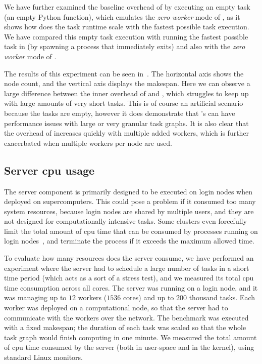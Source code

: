 We have further examined the baseline overhead of \dask{} by executing an empty
task (an empty Python function), which emulates the \emph{zero worker} mode of
\hyperqueue{}, as it shows how does the task runtime scale with the fastest possible task
execution. We have compared this empty task execution with running the fastest possible task in
\hyperqueue{} (by spawning a process that immediately exits) and also with the \emph{zero worker} mode of \hyperqueue{}.

The results of this experiment can be seen in~. The horizontal axis shows
the node count, and the vertical axis displays the makespan. Here we can observe a large difference
between the inner overhead of \hyperqueue{} and \dask{}, which struggles
to keep up with large amounts of very short tasks. This is of course an artificial scenario because
the tasks are empty, however it does demonstrate that \dask{}'s can have
performance issues with large or very granular task graphs. It is also clear that the overhead of
\dask{} increases quickly with multiple added workers, which is further exacerbated
when multiple workers per node are used.


\subsection{Server \gls{cpu} usage}
\label{sec:hq-exp-server-cpu-usage}
The \hyperqueue{} server component is primarily designed to be executed on login nodes
when deployed on supercomputers. This could pose a problem if it consumed too many system
resources, because login nodes are shared by multiple users, and they are not designed for
computationally intensive tasks. Some clusters even forcefully limit the total amount of
\gls{cpu} time that can be consumed by processes running on login
nodes~\cite{leonardo_time_limit}, and terminate the process if it exceeds the maximum allowed time.

To evaluate how many resources does the server consume, we have performed an experiment where the
server had to schedule a large number of tasks in a short time period (which acts as a sort of a
stress test), and we measured its total \gls{cpu} time consumption across all cores.
The server was running on a login node, and it was managing up to $12$ workers
($1536$ cores) and up to $200$ thousand tasks. Each worker was
deployed on a computational node, so that the server had to communicate with the workers over the
network. The benchmark was executed with a fixed makespan; the duration of each task was scaled so
that the whole task graph would finish computing in one minute. We measured the total amount of
\gls{cpu} time consumed by the server (both in user-space and in the kernel), using
standard Linux monitors.


